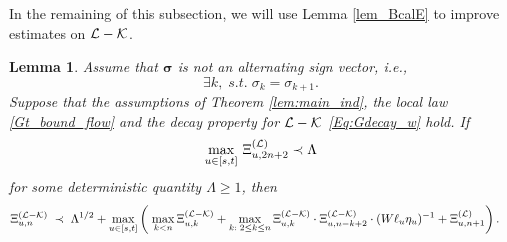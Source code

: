 \documentclass[10pt,reqno]{article}
\theoremstyle{plain} %
\newtheorem{lemma}[theorem]{Lemma}
\theoremstyle{remark}
\numberwithin{equation}{section}
\begin{document}
In the remaining of this subsection, we will use %
Lemma \ref{lem_BcalE} to  improve estimates on $\cal L-\cal K$.  

\begin{lemma}\label{lem:STOeq_NQ} 
Assume that $\boldsymbol{\sigma}$ is not an alternating sign vector, i.e., 
\begin{equation}\label{NALsigm}
    \exists k,\; s.t.\; \sigma_k=\sigma_{k+1}.
\end{equation} 
Suppose that the   assumptions of  Theorem \ref{lem:main_ind},  the local law \eqref{Gt_bound_flow} and the decay property for $\cal L-\cal K$ \eqref{Eq:Gdecay_w} hold. If 
 $$
 \max_{u\in [s,t]}\, \Xi^{(\cal L)}_{u, {2n+2}}\prec {  \Lambda}
 $$
 for some deterministic quantity $ \Lambda \ge 1$, 
then 
\begin{align}\label{am;asoiuw}
 \Xi^{({\cal L-\cal K})}_{u,n}
 \;\prec\;  &\; { \Lambda}^{1/2}+\max_{u\in [s,t]}
  \left(\; \max_{k<n }\Xi^{({\cal L-\cal K})}_{u,k}+\max_{k:\;2\le k\le n }\Xi^{({\cal L-\cal K})}_{u,k}\cdot \Xi^{({\cal L-\cal K})}_{u,n-k+2}\cdot(W\ell_u\eta_u)^{-1}+\Xi^{({\cal L})}_{u,n+1}\right).
\end{align}
 
 
\end{lemma}
\end{document}
